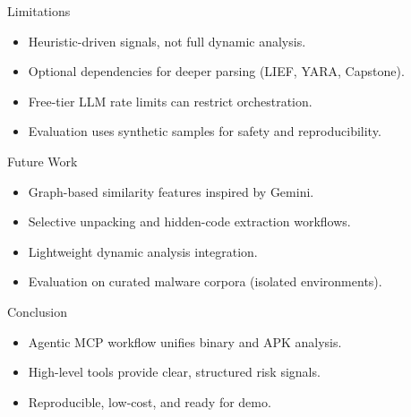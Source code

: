 \documentclass{beamer}
\begin{document}
\begin{frame}{Limitations}
  \begin{itemize}
    \item Heuristic-driven signals, not full dynamic analysis.
    \item Optional dependencies for deeper parsing (LIEF, YARA, Capstone).
    \item Free-tier LLM rate limits can restrict orchestration.
    \item Evaluation uses synthetic samples for safety and reproducibility.
  \end{itemize}
\end{frame}

\begin{frame}{Future Work}
  \begin{itemize}
    \item Graph-based similarity features inspired by Gemini.
    \item Selective unpacking and hidden-code extraction workflows.
    \item Lightweight dynamic analysis integration.
    \item Evaluation on curated malware corpora (isolated environments).
  \end{itemize}
\end{frame}

\begin{frame}{Conclusion}
  \begin{itemize}
    \item Agentic MCP workflow unifies binary and APK analysis.
    \item High-level tools provide clear, structured risk signals.
    \item Reproducible, low-cost, and ready for demo.
  \end{itemize}
\end{frame}
\end{document}
